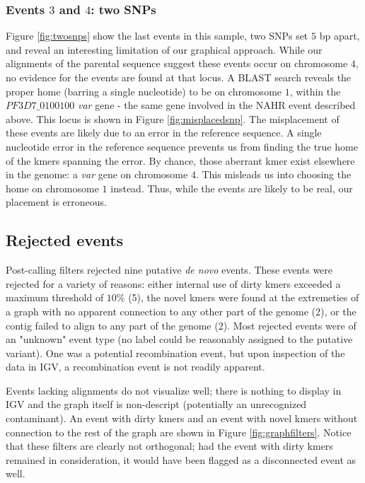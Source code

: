 \subsubsection{Events $3$ and $4$: two SNPs}

Figure \ref{fig:twosnps} show the last events in this sample, two SNPs set $5$ bp apart, and reveal an interesting limitation of our graphical approach.  While our alignments of the parental sequence suggest these events occur on chromosome $4$, no evidence for the events are found at that locus.  A BLAST search reveals the proper home (barring a single nucleotide) to be on chromosome $1$, within the $PF3D7\_0100100$ \textit{var} gene - the same gene involved in the NAHR event described above.  This locus is shown in Figure \ref{fig:misplacedsnp}.  The misplacement of these events are likely due to an error in the reference sequence.  A single nucleotide error in the reference sequence prevents us from finding the true home of the kmers spanning the error.  By chance, those aberrant kmer exist elsewhere in the genome: a \textit{var} gene on chromosome $4$.  This misleads us into choosing the home on chromosome $1$ instead.  Thus, while the events are likely to be real, our placement is erroneous.

\subsection{Rejected events}

Post-calling filters rejected nine putative \textit{de novo} events.  These events were rejected for a variety of reasons: either internal use of dirty kmers exceeded a maximum threshold of $10\%$ (5), the novel kmers were found at the extremeties of a graph with no apparent connection to any other part of the genome (2), or the contig failed to align to any part of the genome (2).  Most rejected events were of an "unknown" event type (no label could be reasonably assigned to the putative variant).  One was a potential recombination event, but upon inspection of the data in IGV, a recombination event is not readily apparent.

Events lacking alignments do not visualize well; there is nothing to display in IGV and the graph itself is non-descript (potentially an unrecognized contaminant).  An event with dirty kmers and an event with novel kmers without connection to the rest of the graph are shown in Figure \ref{fig:graphfilters}.  Notice that these filters are clearly not orthogonal; had the event with dirty kmers remained in consideration, it would have been flagged as a disconnected event as well.


